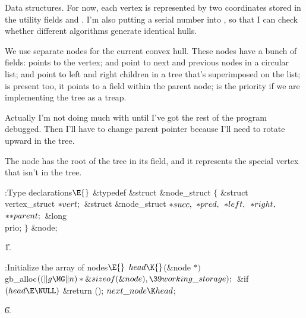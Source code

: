 Data structures.
For now, each vertex is represented by two coordinates stored in the
utility fields  and . I'm also putting a serial
number into
, so that I can check whether different algorithms generate
identical hulls.

We use separate nodes for the current convex hull. These nodes have
a bunch of fields:  points to the vertex;  and 
point to next and previous nodes in a circular list;  and %
point to left and right children in a tree that's superimposed on the list;
 is present too, it points to a field within the parent
node;
 is the priority if we are implementing the tree as a
treap.

Actually I'm not doing much with  until I've got the rest of
the program debugged. Then I'll have to change parent pointer because I'll
need to rotate upward in the tree.

The  node has the root of the tree in its  field,
and
it represents the special vertex that isn't in the tree.

\Y\B\4:Type declarations\X${}\E{}$\6
\&{typedef} \&{struct} \&{node\_struct} ${}\{{}$\1\6
\&{struct} \\{vertex\_struct} ${}{*}\\{vert};{}$\6
\&{struct} \&{node\_struct} ${}{*}\\{succ},{}$ ${}{*}\\{pred},{}$ ${}{*}%
\\{left},{}$ ${}{*}\\{right},{}$ ${}{*}{*}\\{parent};{}$\6
\&{long} \\{prio};\2\6
${}\}{}$ \&{node};\par
\U1.\fi

\B{}:Initialize the array of nodes\X${}\E{}$\6
$\\{head}\K{}$(\&{node} ${}{*}){}$ \\{gb\_alloc}${}((\|g\MG\|n)*\&{sizeof}(%
\&{node}),\39\\{working\_storage});{}$\6
\&{if} ${}(\\{head}\E\NULL){}$\1\5
\&{return} ();\2\6
${}\\{next\_node}\K\\{head}{}$;\par
\U6.\fi


